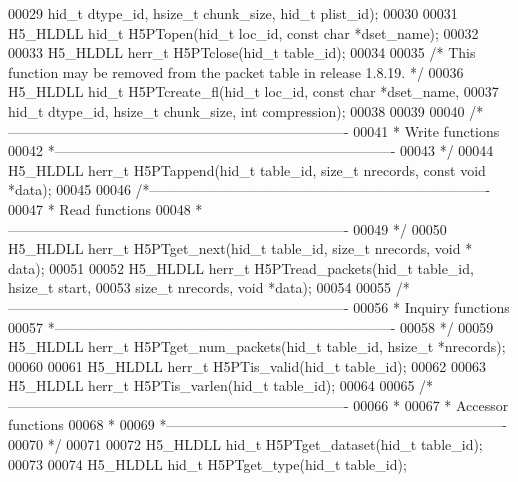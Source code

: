 \begin{DoxyCode}
00029             hid\_t dtype\_id, hsize\_t chunk\_size, hid\_t plist\_id);
00030 
00031 H5\_HLDLL hid\_t H5PTopen(hid\_t loc\_id, \textcolor{keyword}{const} \textcolor{keywordtype}{char} *dset\_name);
00032 
00033 H5\_HLDLL herr\_t H5PTclose(hid\_t table\_id);
00034 
00035 \textcolor{comment}{/* This function may be removed from the packet table in release 1.8.19. */}
00036 H5\_HLDLL hid\_t H5PTcreate\_fl(hid\_t loc\_id, \textcolor{keyword}{const} \textcolor{keywordtype}{char} *dset\_name,
00037             hid\_t dtype\_id, hsize\_t chunk\_size, \textcolor{keywordtype}{int} compression);
00038 
00039 
00040 \textcolor{comment}{/*-------------------------------------------------------------------------}
00041 \textcolor{comment}{ * Write functions}
00042 \textcolor{comment}{ *-------------------------------------------------------------------------}
00043 \textcolor{comment}{ */}
00044 H5\_HLDLL herr\_t H5PTappend(hid\_t table\_id, \textcolor{keywordtype}{size\_t} nrecords, \textcolor{keyword}{const} \textcolor{keywordtype}{void} *data);
00045 
00046 \textcolor{comment}{/*-------------------------------------------------------------------------}
00047 \textcolor{comment}{ * Read functions}
00048 \textcolor{comment}{ *-------------------------------------------------------------------------}
00049 \textcolor{comment}{ */}
00050 H5\_HLDLL herr\_t H5PTget\_next(hid\_t table\_id, \textcolor{keywordtype}{size\_t} nrecords, \textcolor{keywordtype}{void} * data);
00051 
00052 H5\_HLDLL herr\_t H5PTread\_packets(hid\_t table\_id, hsize\_t start,
00053             \textcolor{keywordtype}{size\_t} nrecords, \textcolor{keywordtype}{void} *data);
00054 
00055 \textcolor{comment}{/*-------------------------------------------------------------------------}
00056 \textcolor{comment}{ * Inquiry functions}
00057 \textcolor{comment}{ *-------------------------------------------------------------------------}
00058 \textcolor{comment}{ */}
00059 H5\_HLDLL herr\_t H5PTget\_num\_packets(hid\_t table\_id, hsize\_t *nrecords);
00060 
00061 H5\_HLDLL herr\_t H5PTis\_valid(hid\_t table\_id);
00062 
00063 H5\_HLDLL herr\_t H5PTis\_varlen(hid\_t table\_id);
00064 
00065 \textcolor{comment}{/*-------------------------------------------------------------------------}
00066 \textcolor{comment}{ *}
00067 \textcolor{comment}{ * Accessor functions}
00068 \textcolor{comment}{ *}
00069 \textcolor{comment}{ *-------------------------------------------------------------------------}
00070 \textcolor{comment}{ */}
00071 
00072 H5\_HLDLL hid\_t H5PTget\_dataset(hid\_t table\_id);
00073 
00074 H5\_HLDLL hid\_t H5PTget\_type(hid\_t table\_id);

\end{DoxyCode}
